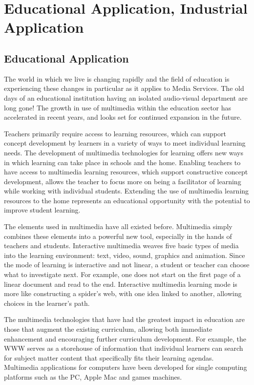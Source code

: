 \section{Educational Application, Industrial Application}
\subsection{Educational Application}
The world in which we live is changing rapidly and the field of education is experiencing these changes in particular as it applies to Media Services. The old days of an educational institution having an isolated audio-visual department are long gone! The growth in use of multimedia within the education sector has accelerated in recent years, and looks set for continued expansion in the future.


Teachers primarily require access to learning resources, which can support concept development by learners in a variety of ways to meet individual learning needs. The development of multimedia technologies for learning offers new ways in which learning can take place in schools and the home. Enabling teachers to have access to multimedia learning resources, which support constructive concept development, allows the teacher to focus more on being a facilitator of learning while working with individual students. Extending the use of multimedia learning resources to the home represents an educational opportunity with the potential to improve student learning.

The elements used in multimedia have all existed before. Multimedia simply combines these elements into a powerful new tool, especially in the hands of teachers and students. Interactive multimedia weaves five basic types of media into the learning environment: text, video, sound, graphics and animation. Since the mode of learning is interactive and not linear, a student or teacher can choose what to investigate next. For example, one does not start on the first page of a linear document and read to the end. Interactive multimedia learning mode is more like constructing a spider’s web, with one idea linked to another, allowing choices in the learner’s path.

The multimedia technologies that have had the greatest impact in education are those that augment the existing curriculum, allowing both immediate enhancement and encouraging further curriculum development. For example, the WWW serves as a storehouse of information that individual learners can search for subject matter content that specifically
fits their learning agendas. Multimedia applications for computers have been developed for single computing platforms such as the PC, Apple Mac and games machines.

